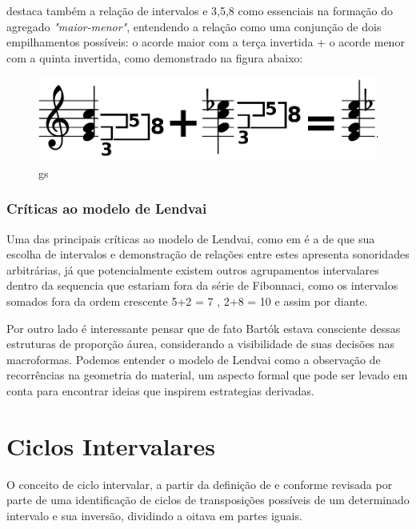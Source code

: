 \documentclass[
	12pt,				%
	openright,			%
	twoside,			%
	a4paper,			%
	english,			%
	french,				%
	spanish,			%
	brazil				%
	]{abntex2}
\begin{document}
 destaca também a relação de intervalos e 3,5,8 como essenciais na formação do agregado \textit{"maior-menor"}, entendendo a relação como uma conjunção de dois empilhamentos possíveis: o acorde maior com a terça invertida + o acorde menor com a quinta invertida, como demonstrado na figura abaixo:

\begin{figure}[!h]
	\caption{\label{fig_grafico}gs  }
	\begin{center}
	    \includegraphics[scale=0.3]{axis/GS_maior_menor.png}
	\end{center}
\end{figure} 



\subsubsection{Críticas ao modelo de Lendvai}

Uma das principais críticas ao modelo de Lendvai, como em  é a de que sua escolha de intervalos e demonstração de relações entre estes apresenta sonoridades arbitrárias, já que potencialmente existem outros agrupamentos intervalares dentro da sequencia que estariam fora da série de Fibonnaci, como os intervalos somados fora da ordem crescente 5+2 = 7 , 2+8 = 10 e assim por diante.

Por outro lado é interessante pensar que de fato Bartók estava consciente dessas estruturas de proporção áurea, considerando a visibilidade de suas decisões nas macroformas. Podemos entender o modelo de Lendvai como a observação de recorrências na geometria do material, um aspecto formal que pode ser levado em conta para encontrar ideias que inspirem estrategias derivadas.




\section{Ciclos Intervalares}

O conceito de ciclo intervalar, a partir da definição de  e conforme revisada por \cite[ p.22]{susanni_antokoletz2012music} parte de uma identificação de ciclos de transposições possíveis de um determinado intervalo e sua inversão, dividindo a oitava em partes iguais.
\end{document}
